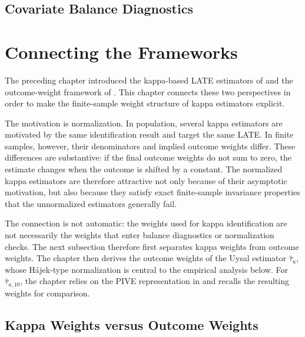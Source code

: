 \documentclass[12pt, a4paper, oneside]{article}
\theoremstyle{plain}
\theoremstyle{definition}
\begin{document}
\subsection{Covariate Balance Diagnostics}
\label{subsec:balance}



\newpage



\section{Connecting the Frameworks}
\label{sec:connection}

The preceding chapter introduced the kappa-based LATE estimators of
\citet{sloczynski2025abadie} and the outcome-weight framework of
\citet{knaus2024treatment}. This chapter connects these two perspectives in order to
make the finite-sample weight structure of kappa estimators explicit.

The motivation is normalization. In population, several kappa estimators are motivated
by the same identification result and target the same LATE. In finite samples,
however, their denominators and implied outcome weights differ. These differences are
substantive: if the final outcome weights do not sum to zero, the estimate changes
when the outcome is shifted by a constant. The normalized kappa estimators are
therefore attractive not only because of their asymptotic motivation, but also because
they satisfy exact finite-sample invariance properties that the unnormalized estimators
generally fail.

The connection is not automatic: the weights used for kappa identification are not
necessarily the weights that enter balance diagnostics or normalization checks. The
next subsection therefore first separates kappa weights from outcome weights. The
chapter then derives the outcome weights of the Uysal estimator \(\hat\tau_u\), whose
H\'ajek-type normalization is central to the empirical analysis below. For
\(\hat\tau_{a,10}\), the chapter relies on the PIVE representation in
\citet[Appendix~A.4]{knaus2024treatment} and recalls the resulting weights for
comparison.

\subsection{Kappa Weights versus Outcome Weights}
\label{subsec:distinction}
\end{document}
